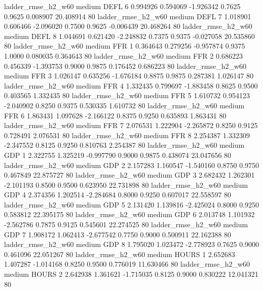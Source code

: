     ladder_rmse_h2_w60     medium     DEFL                 6  0.994926 0.594069 -1.926342 0.7625 0.9625  0.008907   20.408914 80
    ladder_rmse_h2_w60     medium     DEFL                 7  1.018901 0.606466 -2.096020 0.7500 0.9625 -0.006439   20.468264 80
    ladder_rmse_h2_w60     medium     DEFL                 8  1.044691 0.621420 -2.248832 0.7375 0.9375 -0.027058   20.535860 80
    ladder_rmse_h2_w60     medium      FFR                 1  0.364643 0.279256 -0.957874 0.9375 1.0000  0.080035    0.364643 80
    ladder_rmse_h2_w60     medium      FFR                 2  0.686223 0.456339 -1.393753 0.9000 0.9875  0.176452    0.686223 80
    ladder_rmse_h2_w60     medium      FFR                 3  1.026147 0.635256 -1.676184 0.8875 0.9875  0.287381    1.026147 80
    ladder_rmse_h2_w60     medium      FFR                 4  1.332435 0.799697 -1.883458 0.8625 0.9500  0.403565    1.332435 80
    ladder_rmse_h2_w60     medium      FFR                 5  1.610732 0.954123 -2.040902 0.8250 0.9375  0.530335    1.610732 80
    ladder_rmse_h2_w60     medium      FFR                 6  1.863431 1.097628 -2.166122 0.8375 0.9250  0.635893    1.863431 80
    ladder_rmse_h2_w60     medium      FFR                 7  2.076531 1.222904 -2.265872 0.8250 0.9125  0.728491    2.076531 80
    ladder_rmse_h2_w60     medium      FFR                 8  2.254387 1.332309 -2.347552 0.8125 0.9250  0.810763    2.254387 80
    ladder_rmse_h2_w60     medium      GDP                 1  2.322755 1.325219 -0.997790 0.9000 0.9875  0.438074   23.047656 80
    ladder_rmse_h2_w60     medium      GDP                 2  2.157283 1.160547 -1.540160 0.8750 0.9750  0.467849   22.875727 80
    ladder_rmse_h2_w60     medium      GDP                 3  2.682432 1.262301 -2.101193 0.8500 0.9500  0.623950   22.731898 80
    ladder_rmse_h2_w60     medium      GDP                 4  2.374356 1.202514 -2.284684 0.8000 0.9250  0.607017   22.558597 80
    ladder_rmse_h2_w60     medium      GDP                 5  2.131420 1.139816 -2.425024 0.8000 0.9250  0.583812   22.395175 80
    ladder_rmse_h2_w60     medium      GDP                 6  2.013748 1.101932 -2.562786 0.7875 0.9125  0.545601   22.274525 80
    ladder_rmse_h2_w60     medium      GDP                 7  1.908172 1.062413 -2.677542 0.7750 0.9000  0.500911   22.162388 80
    ladder_rmse_h2_w60     medium      GDP                 8  1.795020 1.023472 -2.778923 0.7625 0.9000  0.461096   22.051267 80
    ladder_rmse_h2_w60     medium    HOURS                 1  2.652683 1.407287 -1.014168 0.8250 0.9500  0.776019   11.630466 80
    ladder_rmse_h2_w60     medium    HOURS                 2  2.642938 1.361621 -1.715035 0.8125 0.9000  0.830222   12.041321 80
